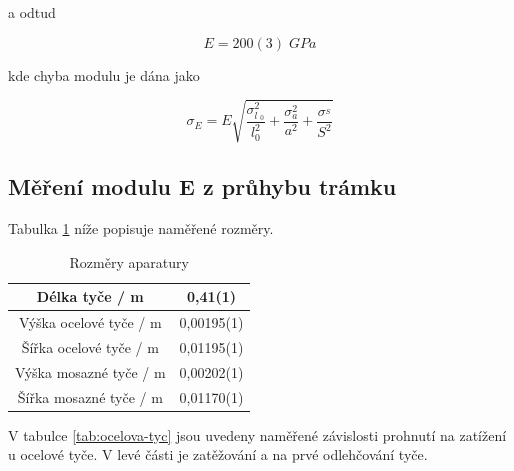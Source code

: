 a odtud

\begin{equation}
    \nonumber
    E = 200(3) \; GPa
\end{equation}

kde chyba modulu je dána jako

\begin{equation}
    \sigma_E = E \sqrt{\frac{\sigma^2_l__0}{l^2_0}+\frac{\sigma^2_a}{a^2}+\frac{\sigma^_S}{S^2}}
\end{equation}

\newpage

\subsection{Měření modulu E z průhybu trámku}

Tabulka \ref{tab:rozmery-aparatury} níže popisuje naměřené rozměry.

\begin{table}[h]
\centering
\begin{tabular}{|c|c|}
\hline
Délka tyče / m         & 0,41(1)    \\ \hline
Výška ocelové tyče / m & 0,00195(1) \\ \hline
Šířka ocelové tyče / m & 0,01195(1) \\ \hline
Výška mosazné tyče / m & 0,00202(1) \\ \hline
Šířka mosazné tyče / m & 0,01170(1)  \\ \hline
\end{tabular}
\caption{Rozměry aparatury}
\label{tab:rozmery-aparatury}
\end{table}

V tabulce \ref{tab:ocelova-tyc} jsou uvedeny naměřené závislosti prohnutí na zatížení u ocelové tyče. V levé části je zatěžování a na prvé odlehčování tyče.

